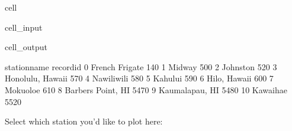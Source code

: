 \documentclass[letterpaper,10pt,english]{jupyterBook}
\begin{document}
\begin{sphinxuseclass}{cell}\begin{sphinxVerbatimInput}

\begin{sphinxuseclass}{cell_input}
\begin{sphinxVerbatim}[commandchars=\\\{\}]
   
\end{sphinxVerbatim}

\end{sphinxuseclass}\end{sphinxVerbatimInput}
\begin{sphinxVerbatimOutput}

\begin{sphinxuseclass}{cell_output}
\begin{sphinxVerbatim}[commandchars=\\\{\}]
         station\PYGZus{}name  record\PYGZus{}id
0      French Frigate        140
1              Midway        500
2            Johnston        520
3    Honolulu, Hawaii        570
4          Nawiliwili        580
5             Kahului        590
6        Hilo, Hawaii        600
7            Mokuoloe        610
8   Barbers Point, HI       5470
9      Kaumalapau, HI       5480
10           Kawaihae       5520
\end{sphinxVerbatim}

\end{sphinxuseclass}\end{sphinxVerbatimOutput}

\end{sphinxuseclass}
\sphinxAtStartPar
Select which station you’d like to plot here:
\end{document}
